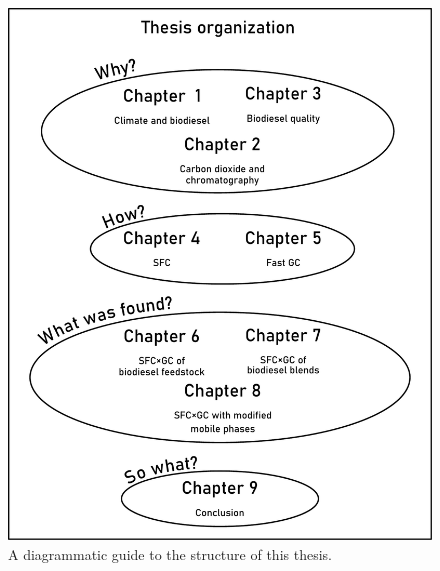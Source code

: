 \begin{figure}[htbp]
\centering
\includegraphics[width=\textwidth]{Figures/ThesisOrganization.pdf}
\decoRule
\caption[Thesis Organization]{A diagrammatic guide to the structure of this thesis.}
\label{fig:ThesisOrganization}
\end{figure}

